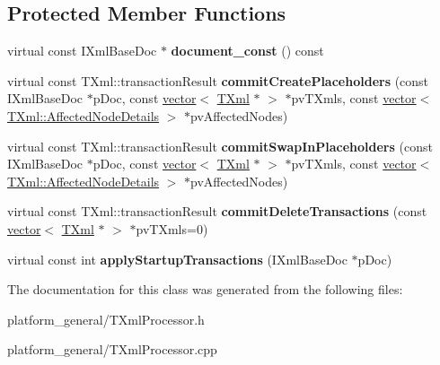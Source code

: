 \subsection*{\-Protected \-Member \-Functions}
\begin{DoxyCompactItemize}
\item 
\hypertarget{classgeneral__server_1_1TXmlProcessor_aaaca396be170c23cce541c6e9edb8e07}{virtual const \-I\-Xml\-Base\-Doc $\ast$ {\bfseries document\-\_\-const} () const }\label{classgeneral__server_1_1TXmlProcessor_aaaca396be170c23cce541c6e9edb8e07}

\item 
\hypertarget{classgeneral__server_1_1TXmlProcessor_a73ef25f8daadd155d0508bdc3b5b8413}{virtual const \*
\-T\-Xml\-::transaction\-Result {\bfseries commit\-Create\-Placeholders} (const \-I\-Xml\-Base\-Doc $\ast$p\-Doc, const \hyperlink{classvector}{vector}$<$ \hyperlink{classgeneral__server_1_1TXml}{\-T\-Xml} $\ast$ $>$ $\ast$pv\-T\-Xmls, const \hyperlink{classvector}{vector}$<$ \hyperlink{structgeneral__server_1_1TXml_1_1AffectedNodeDetails}{\-T\-Xml\-::\-Affected\-Node\-Details} $>$ $\ast$pv\-Affected\-Nodes)}\label{classgeneral__server_1_1TXmlProcessor_a73ef25f8daadd155d0508bdc3b5b8413}

\item 
\hypertarget{classgeneral__server_1_1TXmlProcessor_ab974a87fc00425f2f06232f7b8a2ee35}{virtual const \*
\-T\-Xml\-::transaction\-Result {\bfseries commit\-Swap\-In\-Placeholders} (const \-I\-Xml\-Base\-Doc $\ast$p\-Doc, const \hyperlink{classvector}{vector}$<$ \hyperlink{classgeneral__server_1_1TXml}{\-T\-Xml} $\ast$ $>$ $\ast$pv\-T\-Xmls, const \hyperlink{classvector}{vector}$<$ \hyperlink{structgeneral__server_1_1TXml_1_1AffectedNodeDetails}{\-T\-Xml\-::\-Affected\-Node\-Details} $>$ $\ast$pv\-Affected\-Nodes)}\label{classgeneral__server_1_1TXmlProcessor_ab974a87fc00425f2f06232f7b8a2ee35}

\item 
\hypertarget{classgeneral__server_1_1TXmlProcessor_a3fd1f0d9c3d0d2ee604aed55b15e31fc}{virtual const \*
\-T\-Xml\-::transaction\-Result {\bfseries commit\-Delete\-Transactions} (const \hyperlink{classvector}{vector}$<$ \hyperlink{classgeneral__server_1_1TXml}{\-T\-Xml} $\ast$ $>$ $\ast$pv\-T\-Xmls=0)}\label{classgeneral__server_1_1TXmlProcessor_a3fd1f0d9c3d0d2ee604aed55b15e31fc}

\item 
\hypertarget{classgeneral__server_1_1TXmlProcessor_ab0dc09704cceb322c9dfe94d4164c161}{virtual const int {\bfseries apply\-Startup\-Transactions} (\-I\-Xml\-Base\-Doc $\ast$p\-Doc)}\label{classgeneral__server_1_1TXmlProcessor_ab0dc09704cceb322c9dfe94d4164c161}

\end{DoxyCompactItemize}


\-The documentation for this class was generated from the following files\-:\begin{DoxyCompactItemize}
\item 
platform\-\_\-general/\-T\-Xml\-Processor.\-h\item 
platform\-\_\-general/\-T\-Xml\-Processor.\-cpp\end{DoxyCompactItemize}
